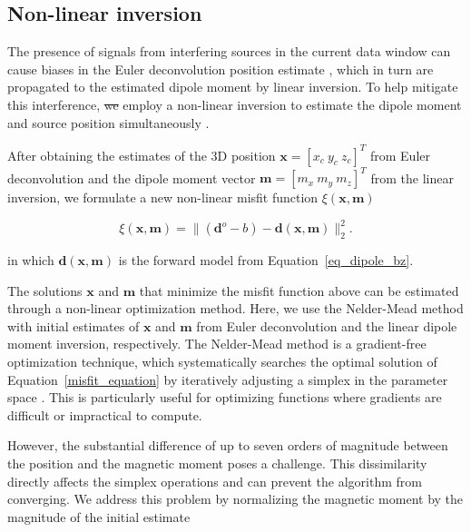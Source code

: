 \documentclass[onecolumn,12pt,a4paper]{article}
\providecommand{\DIFaddtex}[1]{{\protect\color{blue}\uwave{#1}}} %
\providecommand{\DIFdeltex}[1]{{\protect\color{red}\sout{#1}}}                      %
\providecommand{\DIFaddbegin}{} %
\providecommand{\DIFaddend}{} %
\providecommand{\DIFdelbegin}{} %
\providecommand{\DIFdelend}{} %
\providecommand{\DIFadd}[1]{\texorpdfstring{\DIFaddtex{#1}}{#1}} %
\providecommand{\DIFdel}[1]{\texorpdfstring{\DIFdeltex{#1}}{}} %
\newcommand{\DIFscaledelfig}{0.5}
\newlength{\DIFdelgraphicswidth} %
\newlength{\DIFdelgraphicsheight} %
\newcommand{\DIFaddincludegraphics}[2][]{{\color{blue}\fbox{\DIFOincludegraphics[#1]{#2}}}} %
\newcommand{\DIFdelincludegraphics}[2][]{%
\sbox{\DIFdelgraphicsbox}{\DIFOincludegraphics[#1]{#2}}%
\settoboxwidth{\DIFdelgraphicswidth}{\DIFdelgraphicsbox} %
\settoboxtotalheight{\DIFdelgraphicsheight}{\DIFdelgraphicsbox} %
\scalebox{\DIFscaledelfig}{%
\parbox[b]{\DIFdelgraphicswidth}{\usebox{\DIFdelgraphicsbox}\\[-\baselineskip] \rule{\DIFdelgraphicswidth}{0em}}\llap{\resizebox{\DIFdelgraphicswidth}{\DIFdelgraphicsheight}{%
\setlength{\unitlength}{\DIFdelgraphicswidth}%
\begin{picture}(1,1)%
\thicklines\linethickness{2pt} %
{\color[rgb]{1,0,0}\put(0,0){\framebox(1,1){}}}%
{\color[rgb]{1,0,0}\put(0,0){\line( 1,1){1}}}%
{\color[rgb]{1,0,0}\put(0,1){\line(1,-1){1}}}%
\end{picture}%
}\hspace*{3pt}}} %
} %
\DeclareRobustCommand{\DIFaddbegin}{\DIFOaddbegin \let\includegraphics\DIFaddincludegraphics} %
\DeclareRobustCommand{\DIFaddend}{\DIFOaddend \let\includegraphics\DIFOincludegraphics} %
\DeclareRobustCommand{\DIFdelbegin}{\DIFOdelbegin \let\includegraphics\DIFdelincludegraphics} %
\DeclareRobustCommand{\DIFdelend}{\DIFOaddend \let\includegraphics\DIFOincludegraphics} %
\begin{document}
        
\subsection{Non-linear inversion} 

    The presence of signals from interfering sources in the current data window can cause biases in the Euler deconvolution position estimate \citep{Uieda2025}, which in turn are propagated to the estimated dipole moment by linear inversion. 
    To help mitigate this interference, \DIFdelbegin \DIFdel{we }\DIFdelend \DIFaddbegin \DIFadd{one can }\DIFaddend employ a non-linear inversion to estimate the dipole moment and source position simultaneously \DIFaddbegin \DIFadd{\mbox{%
\citep[\textit{e.g.}][]{Lima2016}}\hskip0pt%
}\DIFaddend . 

     After obtaining the estimates of the 3D position $\mathbf{x} = [x_{c}\ y_{c}\ z_{c}]^T$ from Euler deconvolution and the dipole moment vector $\mathbf{m} = [m_{x}\ m_{y}\ m_{z}]^T$ from the linear inversion, we formulate a new non-linear misfit function $\xi(\mathbf{x}, \mathbf{m})$ 

    \begin{equation}
    \label{misfit_equation}
    \xi(\mathbf{x}, \mathbf{m}) = 
    \| (\mathbf{d}^o - b) - \mathbf{d}(\mathbf{x}, \mathbf{m}) \|_2^2.
    \end{equation} 

    \noindent
    in which $\mathbf{d}(\mathbf{x}, \mathbf{m})$ is the forward model from Equation~\ref{eq_dipole_bz}. 

    The solutions $\mathbf{x}$  and $\mathbf{m}$ that minimize the misfit function above can be estimated through a non-linear optimization method. 
    Here, we use the Nelder-Mead method \citep{Nelder-Mead1965,Gao2010} with initial estimates of $\mathbf{x}$ and $\mathbf{m}$ from Euler deconvolution and the linear dipole moment inversion, respectively.    
     The Nelder-Mead method is a gradient-free optimization technique, which systematically searches the optimal solution of Equation~\ref{misfit_equation} by iteratively adjusting a simplex in the parameter space \citep{Nelder-Mead1965}. This is particularly useful for optimizing functions where gradients are difficult or impractical to compute. 

     However, the substantial difference of up to seven orders of magnitude between the position and the magnetic moment poses a challenge. This dissimilarity directly affects the simplex operations and can prevent the algorithm from converging. We address this problem by normalizing the magnetic moment by the magnitude of the initial estimate
\end{document}
